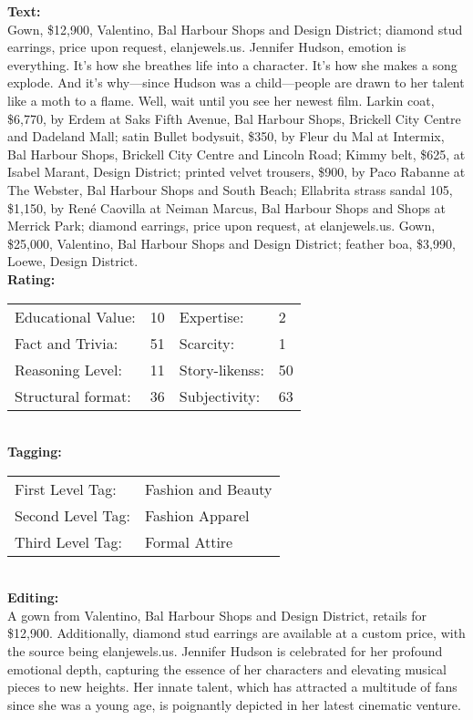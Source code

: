 \begin{tcolorbox}[title = {Case 3}, colframe=darkgreen, colback=lightgray, breakable]
\small
\textbf{Text:}
\\
Gown, \$12,900, Valentino, Bal Harbour Shops and Design District; diamond stud earrings, price upon request, elanjewels.us.
Jennifer Hudson, emotion is everything. It’s how she breathes life into a character. It’s how she makes a song explode. And it’s why—since Hudson was a child—people are drawn to her talent like a moth to a flame. Well, wait until you see her newest film.
Larkin coat, \$6,770, by Erdem at Saks Fifth Avenue, Bal Harbour Shops, Brickell City Centre and Dadeland Mall; satin Bullet bodysuit, \$350, by Fleur du Mal at Intermix, Bal Harbour Shops, Brickell City Centre and Lincoln Road; Kimmy belt, \$625, at Isabel Marant, Design District; printed velvet trousers, \$900, by Paco Rabanne at The Webster, Bal Harbour Shops and South Beach; Ellabrita strass sandal 105, \$1,150, by René Caovilla at Neiman Marcus, Bal Harbour Shops and Shops at Merrick Park; diamond earrings, price upon request, at elanjewels.us.
Gown, \$25,000, Valentino, Bal Harbour Shops and Design District; feather boa, \$3,990, Loewe, Design District.
\\
\textbf{Rating:}
\\
\begin{tabular}{@{}llll}
Educational Value: & 10 & Expertise: & 2 \\ 
Fact and Trivia: & 51 & Scarcity: & 1 \\
Reasoning Level: & 11   & Story-likenss: & 50 \\ 
Structural format: & 36 & Subjectivity: & 63 \\
\end{tabular}
\\
\textbf{Tagging:}
\\
\begin{tabular}{@{}ll}
First Level Tag: & Fashion and Beauty \\
Second Level Tag: & Fashion Apparel \\
Third Level Tag: & Formal Attire \\
\end{tabular}
\\
\textbf{Editing:}
\\
A gown from Valentino, Bal Harbour Shops and Design District, retails for \$12,900. Additionally, diamond stud earrings are available at a custom price, with the source being elanjewels.us. Jennifer Hudson is celebrated for her profound emotional depth, capturing the essence of her characters and elevating musical pieces to new heights. Her innate talent, which has attracted a multitude of fans since she was a young age, is poignantly depicted in her latest cinematic venture.

\end{tcolorbox}

